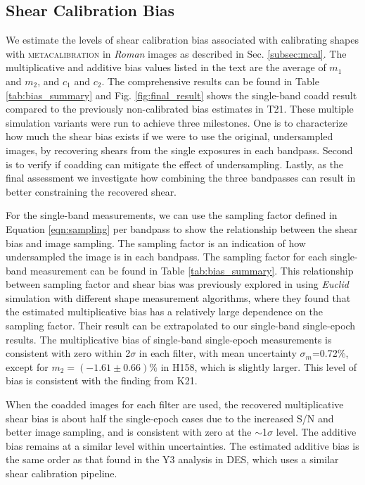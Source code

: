 \documentclass[fleqn,usenatbib]{mnras}
\begin{document}
\subsection{Shear Calibration Bias}
\label{subsec:shapes}
We estimate the levels of shear calibration bias associated with calibrating shapes with \textsc{metacalibration} in \emph{Roman} images as described in Sec. \ref{subsec:mcal}. The multiplicative and additive bias values listed in the text are the average of $m_{1}$ and $m_{2}$, and $c_{1}$ and $c_{2}$. The comprehensive results can be found in Table \ref{tab:bias_summary} and Fig. \ref{fig:final_result} shows the single-band coadd result compared to the previously non-calibrated bias estimates in T21. These multiple simulation variants were run to achieve three milestones. One is to characterize how much the shear bias exists if we were to use the original, undersampled images, by recovering shears from the single exposures in each bandpass. Second is to verify if coadding can mitigate the effect of undersampling. Lastly, as the final assessment we investigate how combining the three bandpasses can result in better constraining the recovered shear.


For the single-band measurements, we can use the sampling factor defined in Equation \ref{eqn:sampling} per bandpass to show the relationship between the shear bias and image sampling. The sampling factor is an indication of how undersampled the image is in each bandpass. The sampling factor for each single-band measurement can be found in Table \ref{tab:bias_summary}. This relationship between sampling factor and shear bias was previously explored in \citealt{2021MNRAS.502.4048K} using \emph{Euclid} simulation with different shape measurement algorithms, where they found that the estimated multiplicative bias has a relatively large dependence on the sampling factor. Their result can be extrapolated to our single-band single-epoch results. The multiplicative bias of single-band single-epoch measurements is consistent with zero within 2$\sigma$ in each filter, with mean uncertainty $\sigma_m$=0.72\%, except for $m_{2}=(-1.61\pm0.66)\%$ in H158, which is slightly larger. This level of bias is consistent with the finding from K21. 


When the coadded images for each filter are used, the recovered multiplicative shear bias is about half the single-epoch cases due to the increased S/N and better image sampling, and is consistent with zero at the $\sim$1$\sigma$ level. The additive bias remains at a similar level within uncertainties. The estimated additive bias is the same order as that found in the Y3 analysis in DES, which uses a similar shear calibration pipeline. 
\end{document}
